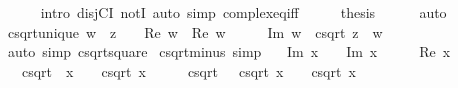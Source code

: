 \begin{isabellebody}
\ \ \ \ \isamarkupfalse%
\ {\isacharparenleft}{\kern0pt}intro\ disjCI\ notI{\isacharparenright}{\kern0pt}\ {\isacharparenleft}{\kern0pt}auto\ simp{\isacharcolon}{\kern0pt}\ complex{\isacharunderscore}{\kern0pt}eq{\isacharunderscore}{\kern0pt}iff{\isacharparenright}{\kern0pt}\isanewline
\ \ \isamarkupfalse%
\ \isamarkupfalse%
\ {\isacharquery}{\kern0pt}thesis\isanewline
\ \ \ \ \isamarkupfalse%
\ auto\isanewline
{}\isamarkupfalse%
%
\endisatagproof
{\isafoldproof}%
%
\isadelimproof
\isanewline
%
\endisadelimproof
\isanewline
{}\isamarkupfalse%
\ csqrt{\isacharunderscore}{\kern0pt}unique{\isacharcolon}{\kern0pt}\ {\isachardoublequoteopen}w\ {\isacharequal}{\kern0pt}\ z\ {\isasymLongrightarrow}\ {}\ {\isacharless}{\kern0pt}\ Re\ w\ {\isasymor}\ Re\ w\ {\isacharequal}{\kern0pt}\ {}\ {\isasymand}\ {}\ {\isasymle}\ Im\ w\ {\isasymLongrightarrow}\ csqrt\ z\ {\isacharequal}{\kern0pt}\ w{\isachardoublequoteclose}\isanewline
%
\isadelimproof
\ \ %
\endisadelimproof
%
\isatagproof
{}\isamarkupfalse%
\ {\isacharparenleft}{\kern0pt}auto\ simp{\isacharcolon}{\kern0pt}\ csqrt{\isacharunderscore}{\kern0pt}square{\isacharparenright}{\kern0pt}%
\endisatagproof
{\isafoldproof}%
%
\isadelimproof
\isanewline
%
\endisadelimproof
\isanewline
{}\isamarkupfalse%
\ csqrt{\isacharunderscore}{\kern0pt}minus\ {\isacharbrackleft}{\kern0pt}simp{\isacharbrackright}{\kern0pt}{\isacharcolon}{\kern0pt}\isanewline
\ \ \ {\isachardoublequoteopen}Im\ x\ {\isacharless}{\kern0pt}\ {}\ {\isasymor}\ {\isacharparenleft}{\kern0pt}Im\ x\ {\isacharequal}{\kern0pt}\ {}\ {\isasymand}\ {}\ {\isasymle}\ Re\ x{\isacharparenright}{\kern0pt}{\isachardoublequoteclose}\isanewline
\ \ \ {\isachardoublequoteopen}csqrt\ {\isacharparenleft}{\kern0pt}{\isacharminus}{\kern0pt}\ x{\isacharparenright}{\kern0pt}\ {\isacharequal}{\kern0pt}\ {\isasymi}\ {\isacharasterisk}{\kern0pt}\ csqrt\ x{\isachardoublequoteclose}\isanewline
%
\isadelimproof
%
\endisadelimproof
%
\isatagproof
{}\isamarkupfalse%
\ {\isacharminus}{\kern0pt}\isanewline
\ \ \isamarkupfalse%
\ {\isachardoublequoteopen}csqrt\ {\isacharparenleft}{\kern0pt}{\isacharparenleft}{\kern0pt}{\isasymi}\ {\isacharasterisk}{\kern0pt}\ csqrt\ x{\isacharparenright}{\kern0pt}{\isacharcircum}{\kern0pt}{}{\isacharparenright}{\kern0pt}\ {\isacharequal}{\kern0pt}\ {\isasymi}\ {\isacharasterisk}{\kern0pt}\ csqrt\ x{\isachardoublequoteclose}\isanewline

\end{isabellebody}
